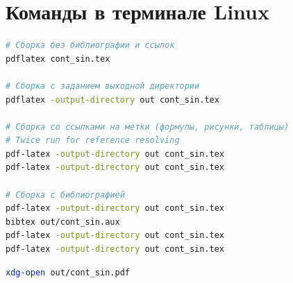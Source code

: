 %

\chapter{Команды в терминале Linux}

\begin{lstlisting}[caption={Сборка проекта}, language=bash]
# Cборка без библиографии и ссылок
pdflatex cont_sin.tex

# Cборка с заданием выходной директории
pdflatex -output-directory out cont_sin.tex

# Cборка со ссылками на метки (формулы, рисунки, таблицы)
# Twice run for reference resolving
pdf-latex -output-directory out cont_sin.tex
pdf-latex -output-directory out cont_sin.tex

# Сборка с библиографией
pdf-latex -output-directory out cont_sin.tex
bibtex out/cont_sin.aux
pdf-latex -output-directory out cont_sin.tex
pdf-latex -output-directory out cont_sin.tex
\end{lstlisting}

\begin{lstlisting}[caption={Открытие pdf файла в терминале}, language=bash]
xdg-open out/cont_sin.pdf
\end{lstlisting}

%
